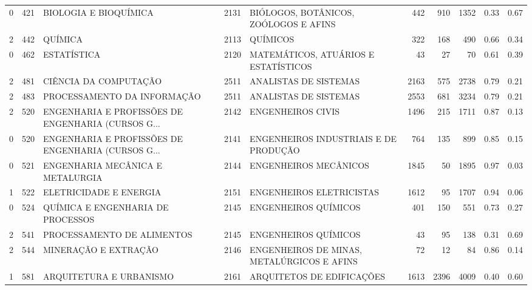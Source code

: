 \begin{table}
\begin{tabular}{rrlrlrrrrr}
       0 &    421 &                              BIOLOGIA E BIOQUÍMICA & 2131 &              BIÓLOGOS, BOTÂNICOS, ZOÓLOGOS E AFINS &   442 &   910 &   1352 & 0.33 & 0.67 \\
       2 &    442 &                                            QUÍMICA & 2113 &                                           QUÍMICOS &   322 &   168 &    490 & 0.66 & 0.34 \\
       0 &    462 &                                        ESTATÍSTICA & 2120 &               MATEMÁTICOS, ATUÁRIOS E ESTATÍSTICOS &    43 &    27 &     70 & 0.61 & 0.39 \\
       2 &    481 &                              CIÊNCIA DA COMPUTAÇÃO & 2511 &                              ANALISTAS DE SISTEMAS &  2163 &   575 &   2738 & 0.79 & 0.21 \\
       2 &    483 &                        PROCESSAMENTO DA INFORMAÇÃO & 2511 &                              ANALISTAS DE SISTEMAS &  2553 &   681 &   3234 & 0.79 & 0.21 \\
       2 &    520 & ENGENHARIA E PROFISSÕES DE ENGENHARIA (CURSOS G... & 2142 &                                 ENGENHEIROS CIVIS  &  1496 &   215 &   1711 & 0.87 & 0.13 \\
       0 &    520 & ENGENHARIA E PROFISSÕES DE ENGENHARIA (CURSOS G... & 2141 &              ENGENHEIROS INDUSTRIAIS E DE PRODUÇÃO &   764 &   135 &    899 & 0.85 & 0.15 \\
       0 &    521 &                   ENGENHARIA MECÂNICA E METALURGIA & 2144 &                              ENGENHEIROS MECÂNICOS &  1845 &    50 &   1895 & 0.97 & 0.03 \\
       1 &    522 &                             ELETRICIDADE E ENERGIA & 2151 &                           ENGENHEIROS ELETRICISTAS &  1612 &    95 &   1707 & 0.94 & 0.06 \\
       0 &    524 &                  QUÍMICA E ENGENHARIA DE PROCESSOS & 2145 &                               ENGENHEIROS QUÍMICOS &   401 &   150 &    551 & 0.73 & 0.27 \\
       2 &    541 &                         PROCESSAMENTO DE ALIMENTOS & 2145 &                               ENGENHEIROS QUÍMICOS &    43 &    95 &    138 & 0.31 & 0.69 \\
       2 &    544 &                               MINERAÇÃO E EXTRAÇÃO & 2146 &         ENGENHEIROS DE MINAS, METALÚRGICOS E AFINS &    72 &    12 &     84 & 0.86 & 0.14 \\
       1 &    581 &                            ARQUITETURA E URBANISMO & 2161 &                          ARQUITETOS DE EDIFICAÇÕES &  1613 &  2396 &   4009 & 0.40 & 0.60 \\

\end{tabular}
\end{table}
